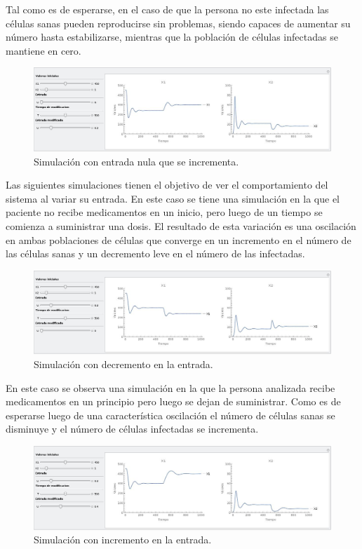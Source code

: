 \documentclass{article}
\begin{document}
Tal como es de esperarse, en el caso de que la persona no este infectada las células
sanas pueden reproducirse sin problemas, siendo capaces de aumentar su número hasta
estabilizarse, mientras que la población de células infectadas se mantiene
en cero.

\begin{figure}[H]
    \includegraphics[width=\textwidth]{Images/Vih-noinput-input.jpeg}
    \caption{Simulación con entrada nula que se incrementa.}
\end{figure}

Las siguientes simulaciones tienen el objetivo de ver el comportamiento del
sistema al variar su entrada. En este caso se tiene una simulación en la que
el paciente no recibe medicamentos en un inicio, pero luego de un tiempo se comienza
a suministrar una dosis. El resultado de esta variación es una oscilación en ambas
poblaciones de células que converge en un incremento en el número
de las células sanas y un decremento leve en el número de las infectadas.

\begin{figure}[H]
    \includegraphics[width=\textwidth]{Images/Vih-input-noinput.jpeg}
    \caption{Simulación con decremento en la entrada.}
\end{figure}

En este caso se observa una simulación en la que la persona analizada recibe
medicamentos en un principio pero luego se dejan de suministrar. Como es de esperarse
luego de una característica oscilación el número de células sanas se disminuye
y el número de células infectadas se incrementa.

\begin{figure}[H]
    \includegraphics[width=\textwidth]{Images/Vih-input-moreinput.jpeg}
    \caption{Simulación con incremento en la entrada.}
\end{figure}
\end{document}
